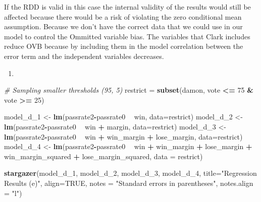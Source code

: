 \documentclass[
  12pt,
  landscape]{article}
\newenvironment{Shaded}{\begin{snugshade}}{\end{snugshade}}
\newcommand{\CommentTok}[1]{\textcolor[rgb]{0.56,0.35,0.01}{\textit{#1}}}
\newcommand{\DataTypeTok}[1]{\textcolor[rgb]{0.13,0.29,0.53}{#1}}
\newcommand{\DecValTok}[1]{\textcolor[rgb]{0.00,0.00,0.81}{#1}}
\newcommand{\KeywordTok}[1]{\textcolor[rgb]{0.13,0.29,0.53}{\textbf{#1}}}
\newcommand{\NormalTok}[1]{#1}
\newcommand{\OperatorTok}[1]{\textcolor[rgb]{0.81,0.36,0.00}{\textbf{#1}}}
\newcommand{\OtherTok}[1]{\textcolor[rgb]{0.56,0.35,0.01}{#1}}
\newcommand{\StringTok}[1]{\textcolor[rgb]{0.31,0.60,0.02}{#1}}
\begin{document}
If the RDD is valid in this case the internal validity of the results
would still be affected because there would be a risk of violating the
zero conditional mean assumption. Because we don't have the correct data
that we could use in our model to control the Ommitted variable bias.
The variables that Clark includes reduce OVB because by including them
in the model correlation between the error term and the independent
variables decreases.

\begin{enumerate}
\def\labelenumi{(\alph{enumi})}
\setcounter{enumi}{4}
\item
\end{enumerate}

\begin{Shaded}
\begin{Highlighting}[]
\CommentTok{# Sampling smaller thresholds (95, 5)}
\NormalTok{restrict =}\StringTok{ }\KeywordTok{subset}\NormalTok{(damon, vote }\OperatorTok{<=}\StringTok{ }\DecValTok{75} \OperatorTok{&}\StringTok{ }\NormalTok{vote }\OperatorTok{>=}\StringTok{ }\DecValTok{25}\NormalTok{)}

\NormalTok{model_d_}\DecValTok{1}\NormalTok{ <-}\StringTok{ }\KeywordTok{lm}\NormalTok{(passrate2}\OperatorTok{-}\NormalTok{passrate0 }\OperatorTok{~}\StringTok{ }\NormalTok{win, }\DataTypeTok{data=}\NormalTok{restrict)}
\NormalTok{model_d_}\DecValTok{2}\NormalTok{ <-}\StringTok{ }\KeywordTok{lm}\NormalTok{(passrate2}\OperatorTok{-}\NormalTok{passrate0 }\OperatorTok{~}\StringTok{ }\NormalTok{win }\OperatorTok{+}\StringTok{ }\NormalTok{margin, }\DataTypeTok{data=}\NormalTok{restrict)}
\NormalTok{model_d_}\DecValTok{3}\NormalTok{ <-}\StringTok{ }\KeywordTok{lm}\NormalTok{(passrate2}\OperatorTok{-}\NormalTok{passrate0 }\OperatorTok{~}\StringTok{ }\NormalTok{win }\OperatorTok{+}\StringTok{ }\NormalTok{win_margin }\OperatorTok{+}\StringTok{ }\NormalTok{lose_margin, }\DataTypeTok{data=}\NormalTok{restrict)}
\NormalTok{model_d_}\DecValTok{4}\NormalTok{ <-}\StringTok{ }\KeywordTok{lm}\NormalTok{(passrate2}\OperatorTok{-}\NormalTok{passrate0 }\OperatorTok{~}\StringTok{ }\NormalTok{win }\OperatorTok{+}\StringTok{ }\NormalTok{win_margin }\OperatorTok{+}\StringTok{ }\NormalTok{lose_margin }\OperatorTok{+}\StringTok{ }\NormalTok{win_margin_squared }\OperatorTok{+}\StringTok{ }\NormalTok{lose_margin_squared, }\DataTypeTok{data =}\NormalTok{ restrict)}

\KeywordTok{stargazer}\NormalTok{(model_d_}\DecValTok{1}\NormalTok{, model_d_}\DecValTok{2}\NormalTok{, model_d_}\DecValTok{3}\NormalTok{, model_d_}\DecValTok{4}\NormalTok{, }\DataTypeTok{title=}\StringTok{"Regression Results (e)"}\NormalTok{, }\DataTypeTok{align=}\OtherTok{TRUE}\NormalTok{, }\DataTypeTok{notes =} \StringTok{"Standard errors in parentheses"}\NormalTok{, }\DataTypeTok{notes.align =} \StringTok{"l"}\NormalTok{)}
\end{Highlighting}
\end{Shaded}
\end{document}
